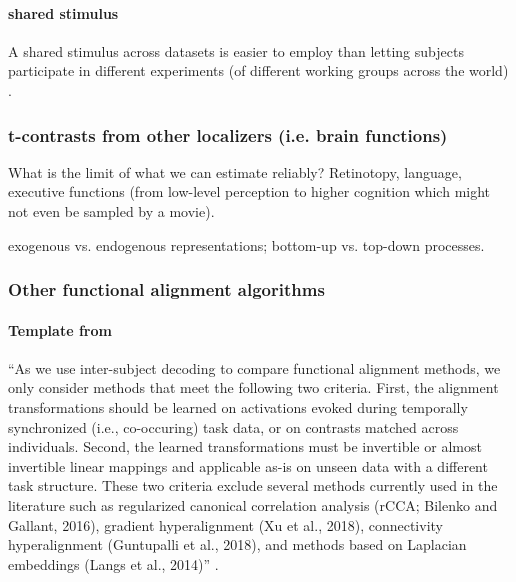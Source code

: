 \paragraph{shared stimulus}

%
A shared stimulus across datasets is easier to employ than letting subjects
participate in different experiments (of different working groups across the
world) \citep[(s.][ for an \ac{srm} based on "shared subjects acrpss
datasets]{zhang2018transfer}.


\subsubsection{t-contrasts from other localizers (i.e. brain functions)}

%
What is the limit of what we can estimate reliably?
%
Retinotopy, language, executive functions (from low-level perception to higher
cognition which might not even be sampled by a movie).

%
exogenous vs. endogenous representations; bottom-up vs. top-down processes.


\subsubsection{Other functional alignment algorithms}




\paragraph{Template from \citet{bazeille2021empirical}}
%
``As we use inter-subject decoding to compare functional alignment methods, we
only consider methods that meet the following two criteria.
%
First, the alignment transformations should be learned on activations evoked
during temporally synchronized (i.e., co-occuring) task data, or on contrasts
matched across individuals.
%
Second, the learned transformations must be invertible or almost invertible
linear mappings and applicable as-is on unseen data with a different task
structure.
%
These two criteria exclude several methods currently used in the literature such
as regularized canonical correlation analysis (rCCA; Bilenko and Gallant, 2016),
gradient hyperalignment (Xu et al., 2018), connectivity hyperalignment
(Guntupalli et al., 2018), and methods based on Laplacian embeddings (Langs et
al., 2014)'' \citep{bazeille2021empirical}.

